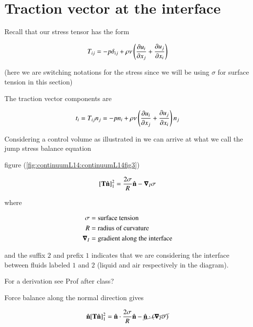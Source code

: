 \section{Traction vector at the interface}

Recall that our stress tensor has the form

\begin{equation}\label{eqn:continuumL14:90}
T_{ij} = 
- p \delta_{ij} + \rho \nu \left( 
\PD{x_j}{u_i}
+\PD{x_i}{u_j}
\right)
\end{equation}

(here we are switching notations for the stress since we will be using $\sigma$ for surface tension in this section)

The traction vector components are

\begin{equation}\label{eqn:continuumL14:110}
t_i = T_{ij} n_j =
- p n_i + \rho \nu \left( 
\PD{x_j}{u_i}
+\PD{x_i}{u_j}
\right) n_j
\end{equation}

Considering a control volume as illustrated in we can arrive at what we call the jump stress balance equation

figure (\ref{fig:continuumL14:continuumL14fig3})

\begin{equation}\label{eqn:continuumL14:130}
[\BT \ncap]^2_1 = \frac{2 \sigma}{R} \ncap - \spacegrad_I \sigma
\end{equation}

where

\begin{align}\label{eqn:continuumL14:150}
\sigma &= \text{surface tension} \\
R &= \text{radius of curvature} \\
\spacegrad_I &= \text{gradient along the interface}
\end{align}

and the suffix $2$ and prefix $1$ indicates that we are considering the interface between fluids labeled $1$ and $2$ (liquid and air respectively in the diagram).

For a derivation see Prof after class?

Force balance along the normal direction gives

\begin{equation}\label{eqn:continuumL14:170}
\ncap [\BT \ncap]^2_1 = \ncap \cdot \frac{2 \sigma}{R} \ncap - \cancel{\ncap \cdot (\spacegrad_I \sigma)}
\end{equation}

